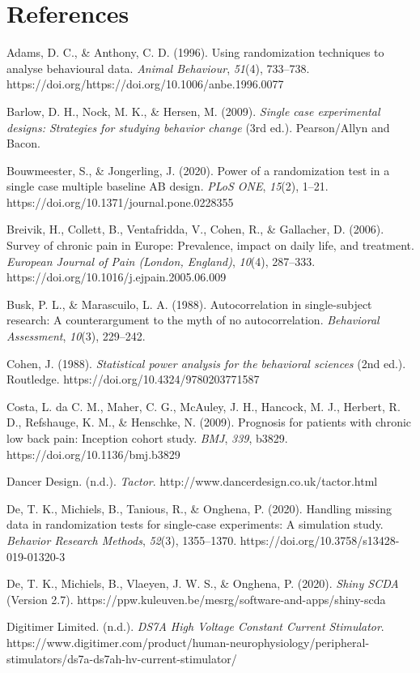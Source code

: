 \documentclass{article}
\begin{document}
\section{References}

Adams, D. C., \& Anthony, C. D. (1996). Using randomization techniques to analyse behavioural data. \emph{Animal Behaviour}, \emph{51}(4), 733--738. https://doi.org/https://doi.org/10.1006/anbe.1996.0077

Barlow, D. H., Nock, M. K., \& Hersen, M. (2009). \emph{Single case experimental designs: Strategies for studying behavior change} (3rd ed.). Pearson/Allyn and Bacon.

Bouwmeester, S., \& Jongerling, J. (2020). Power of a randomization test in a single case multiple baseline AB design. \emph{PLoS ONE}, \emph{15}(2), 1--21. https://doi.org/10.1371/journal.pone.0228355

Breivik, H., Collett, B., Ventafridda, V., Cohen, R., \& Gallacher, D. (2006). Survey of chronic pain in Europe: Prevalence, impact on daily life, and treatment. \emph{European Journal of Pain (London, England)}, \emph{10}(4), 287--333. https://doi.org/10.1016/j.ejpain.2005.06.009

Busk, P. L., \& Marascuilo, L. A. (1988). Autocorrelation in single-subject research: A counterargument to the myth of no autocorrelation. \emph{Behavioral Assessment}, \emph{10}(3), 229--242.

Cohen, J. (1988). \emph{Statistical power analysis for the behavioral sciences} (2nd ed.). Routledge. https://doi.org/10.4324/9780203771587

Costa, L. da C. M., Maher, C. G., McAuley, J. H., Hancock, M. J., Herbert, R. D., Refshauge, K. M., \& Henschke, N. (2009). Prognosis for patients with chronic low back pain: Inception cohort study. \emph{BMJ}, \emph{339}, b3829. https://doi.org/10.1136/bmj.b3829

Dancer Design. (n.d.). \emph{Tactor}. http://www.dancerdesign.co.uk/tactor.html

De, T. K., Michiels, B., Tanious, R., \& Onghena, P. (2020). Handling missing data in randomization tests for single-case experiments: A simulation study. \emph{Behavior Research Methods}, \emph{52}(3), 1355--1370. https://doi.org/10.3758/s13428-019-01320-3

De, T. K., Michiels, B., Vlaeyen, J. W. S., \& Onghena, P. (2020). \emph{Shiny SCDA} (Version 2.7). https://ppw.kuleuven.be/mesrg/software-and-apps/shiny-scda

Digitimer Limited. (n.d.). \emph{DS7A High Voltage Constant Current Stimulator}. https://www.digitimer.com/product/human-neurophysiology/peripheral-stimulators/ds7a-ds7ah-hv-current-stimulator/
\end{document}

